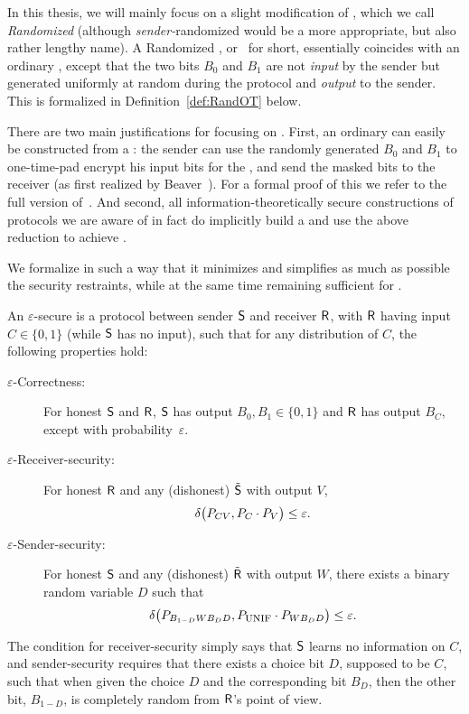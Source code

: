 In this thesis, we will mainly focus on a slight modification of \OT,
which we call {\em Randomized \OT} (although {\em sender-}randomized
\OT would be a more appropriate, but also rather lengthy name). A
Randomized \OT, or \RandOT\ for short, essentially coincides with an
ordinary \OT, except that the two bits $B_0$ and $B_1$ are not {\em
  input} by the sender but generated uniformly at random during the
protocol and {\em output} to the sender. This is formalized in
Definition~\ref{def:RandOT} below.

There are two main justifications for focusing on \RandOT. First, an
ordinary \OT can easily be constructed from a \RandOT: the sender can
use the randomly generated $B_0$ and $B_1$ to one-time-pad encrypt his
input bits for the \OT, and send the masked bits to the receiver (as
first realized by Beaver~\cite{Beaver95}). For a formal proof of this we
refer to the full version of~\cite{CSSW06}. 
And second, all information-theoretically secure constructions of \OT 
protocols we are aware of in fact do implicitly build a \RandOT and
use the above reduction to achieve \OT.

We formalize \RandOT in such a way that it 
minimizes and simplifies as much as possible the security restraints,
while at the same time remaining sufficient for \OT.

\begin{definition}[\RandOT]\label{def:RandOT}
  An $\varepsilon$-secure {\em \RandOT} is a protocol between sender
  $\S$ and receiver $\R$, with $\R$ having input $C \in \{0,1\}$
  (while $\S$ has no input), such that for any distribution of $C$,
  the following properties hold:
\begin{description}
\item[\boldmath$\varepsilon$-Correctness:] For honest $\S$ and $\R$, $\S$ has output $B_0,B_1 \in \{0,1\}$ and $\R$ has output
  $B_C$, except with probability~$\varepsilon$.\vspace{1ex}
\item[\boldmath$\varepsilon$-Receiver-security:] For honest $\R$ and any
  (dishonest) $\dS$ with output $V$,
\[\dist{ P_{C V} , P_{C} \cdot P_{V} } \leq \eps.\] 
\item[\boldmath$\varepsilon$-Sender-security:] For honest $\S$ and any
  (dishonest) $\dR$ with output $W$, there exists a binary
  random variable $D$ such that 
\[ \dist{ P_{B_{1-D} W B_D D} , P_{\unif} \cdot P_{W B_D D} } \leq \eps.
\]
\end{description}
\end{definition}
%
The condition for receiver-security simply says that $\S$ learns no
information on $C$, and sender-security requires that there exists a
choice bit $D$, supposed to be $C$, such that when given the choice
$D$ and the corresponding bit $B_D$, then the other bit, $B_{1-D}$, is
completely random from $\R$'s point of view.

